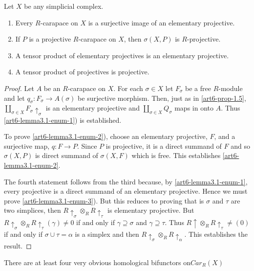 \begin{lemma}\label{art6-lemma-3.1}
Let $X$ be any simplicial complex.
    \begin{enumerate}[(1)]
    \item Every $R$-carapace on $X$ is a surjective image of an elementary projective.\label{art6-lemma3.1-enum-1}
    \item If $P$ is a projective $R$-carapace on $X$, then $\sigma(X, P)$ is $R$-projective.\label{art6-lemma3.1-enum-2}
    \item A tensor product of elementary projectives is an elementary projective.\label{art6-lemma3.1-enum-3}
    \item A tensor product of projectives is projective.\label{art6-lemma3.1-enum-4}
    \end{enumerate}
\end{lemma}

\begin{proof}
Let $A$ be an $R$-carapace on $X$. For each $\sigma \in X$ let $F_{\sigma}$ be a free $R$-module and let $q_{\sigma} : F_{\sigma} \rightarrow A(\sigma)$ be surjective morphism. Then, just as in \ref{art6-prop-1.5}, $\coprod_{\sigma \in X}F_{\sigma} \uparrow_{\sigma}$ is an elementary projective and $\coprod_{\sigma \in X}Q_{\sigma}$ maps in onto $A$. Thus \ref{art6-lemma3.1-enum-1}) is established.

To prove \ref{art6-lemma3.1-enum-2}), choose an elementary projective, $F$, and a surjective map, $q: F\rightarrow P$. Since $P$ is projective, it is a direct summand of $F$ and so $\sigma(X, P)$ is direct summand of $\sigma(X, F)$ which is free. This establishes \ref{art6-lemma3.1-enum-2}.

The fourth statement follows from the third because, by \ref{art6-lemma3.1-enum-1}, every projective is a direct summand of an elementary projective. Hence we must prove \ref{art6-lemma3.1-enum-3}). But this reduces to proving that is $\sigma$ and $\tau$ are two simplices, then $R\uparrow_{\sigma} \otimes_{R}R \uparrow_{\tau}$ is elementary projective. But $R\uparrow_{\sigma}\otimes_{R}R\uparrow_{\tau}(\gamma) \neq 0$ if and only if $\gamma \supseteq \sigma$ and $\gamma \supseteq \tau$. Thus $R\uparrow \otimes_{R}R \uparrow_{\tau}\neq (0)$ if and only if $\sigma \cup \tau = \alpha$ is a simplex and then $R\uparrow_{\sigma}\otimes_{R}R \uparrow_{\alpha}$. This establishes the result. 
\end{proof}

There are at least four very obvious homological bifunctors on\break $C ar_{R}(X)$

